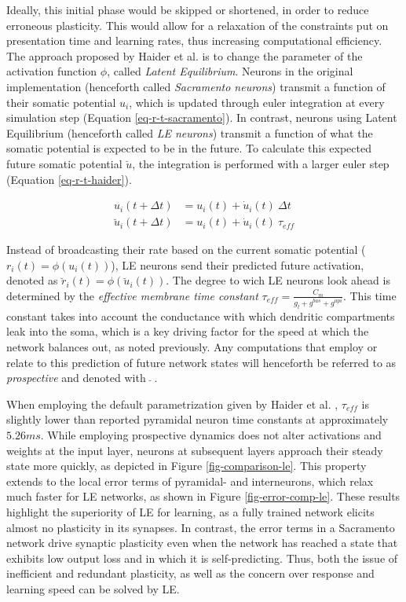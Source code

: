 Ideally, this initial phase would be skipped or shortened, in order to reduce erroneous plasticity. This would allow for
a relaxation of the constraints put on presentation time and learning rates, thus increasing computational efficiency.
The approach proposed by Haider et al. is to change the parameter of the activation function $\phi$, called
\textit{Latent Equilibrium}. Neurons in the original implementation (henceforth called \textit{Sacramento neurons})
transmit a function of their somatic potential $u_i$, which is updated through euler integration at every simulation
step (Equation \ref{eq-r-t-sacramento}). In contrast, neurons using Latent Equilibrium (henceforth called \textit{LE
  neurons}) transmit a function of what the somatic potential is expected to be in the future. To calculate this expected
future somatic potential $\breve{u}$, the integration is performed with a larger euler step (Equation
\ref{eq-r-t-haider}).

\begin{align}
  u_i(t+ \Delta t)          & = u_i(t) + \dot{u}_i(t) \ \Delta t \label{eq-r-t-sacramento} \\
  \breve{u}_i(t + \Delta t) & = u_i(t) + \dot{u}_i(t) \ \tau_{eff} \label{eq-r-t-haider}
\end{align}

Instead of broadcasting their rate based on the current somatic potential ($r_i(t) = \phi(u_i(t))$), LE neurons send
their predicted future activation, denoted as $\breve{r}_i(t) = \phi(\breve{u}_i(t))$. The degree to wich LE neurons
look ahead is determined by the \textit{effective membrane time constant} $\tau_{eff} = \frac{C_m}{g_l + g^{bas} +
    g^{api}}$. This time constant takes into account the conductance with which dendritic compartments leak into the soma,
which is a key driving factor for the speed at which the network balances out, as noted previously. Any computations
that employ or relate to this prediction of future network states will henceforth be referred to as \textit{prospective}
and denoted with $\ \breve{} \ $.

When employing the default parametrization given by Haider et al. , $\tau_{eff}$ is
slightly lower than reported pyramidal neuron time constants \citep{McCormick1985} at approximately $5.26ms$. While
employing prospective dynamics does not alter activations and weights at the input layer, neurons at subsequent layers
approach their steady state more quickly, as depicted in Figure \ref{fig-comparison-le}. This property extends to the
local error terms of pyramidal- and interneurons, which relax much faster for LE networks, as shown in Figure
\ref{fig-error-comp-le}. These results highlight the superiority of LE for learning, as a fully trained network elicits
almost no plasticity in its synapses. In contrast, the error terms in a Sacramento network drive synaptic plasticity
even when the network has reached a state that exhibits low output loss and in which it is self-predicting. Thus, both
the issue of inefficient and redundant plasticity, as well as the concern over response and learning speed can be solved
by LE.\newline


